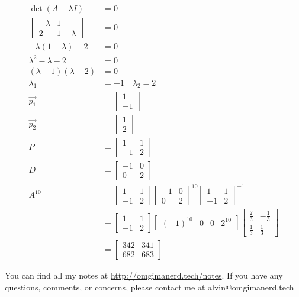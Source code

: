 \documentclass{math}
\begin{document}
\begin{align*}
  \det(A-\lambda I) &= 0 \\
  \begin{vmatrix}-\lambda & 1 \\ 2 & 1-\lambda\end{vmatrix} &= 0 \\
  -\lambda(1-\lambda)-2 &= 0 \\
  \lambda^2-\lambda-2 &= 0 \\
  (\lambda+1)(\lambda-2) &= 0 \\
  \lambda_1 &= -1 \quad \lambda_2 = 2 \\
  \vec{p_1} &= \begin{bmatrix}1 \\ -1\end{bmatrix} \\
  \vec{p_2} &= \begin{bmatrix}1 \\ 2\end{bmatrix} \\
  P &= \begin{bmatrix}
    1 & 1 \\
    -1 & 2
  \end{bmatrix} \\
  D &= \begin{bmatrix}
    -1 & 0 \\
    0 & 2
  \end{bmatrix} \\
  A^{10} &= \begin{bmatrix}1 & 1 \\ -1 & 2\end{bmatrix}
    \begin{bmatrix}-1 & 0 \\ 0 & 2\end{bmatrix}^{10}
    \begin{bmatrix}1 & 1 \\ -1 & 2\end{bmatrix}^{-1} \\
  &= \begin{bmatrix}1 & 1 \\ -1 & 2\end{bmatrix}
    \begin{bmatrix}(-1)^{10} & 0 & 0 & 2^{10}\end{bmatrix}
    \begin{bmatrix}
      \frac{2}{3} & -\frac{1}{3} \\ \frac{1}{3} & \frac{1}{3}
    \end{bmatrix} \\
  &= \begin{bmatrix}
    342 & 341 \\
    682 & 683
  \end{bmatrix}
\end{align*}

\begin{center}
  You can find all my notes at \url{http://omgimanerd.tech/notes}. If you have
  any questions, comments, or concerns, please contact me at
  alvin@omgimanerd.tech
\end{center}
\end{document}
